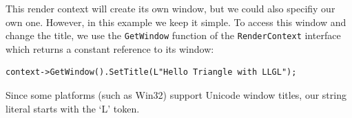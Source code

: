 \documentclass{article}
\begin{document}
This render context will create its own window, but we could also specifiy our own one.
However, in this example we keep it simple. To access this window and change the title,
we use the \texttt{GetWindow} function of the \texttt{RenderContext} interface
which returns a constant reference to its window:
\begin{lstlisting}
context->GetWindow().SetTitle(L"Hello Triangle with LLGL");
\end{lstlisting}
Since some platforms (such as Win32) support Unicode window titles, our string literal starts with the `L' token.





\end{document}
